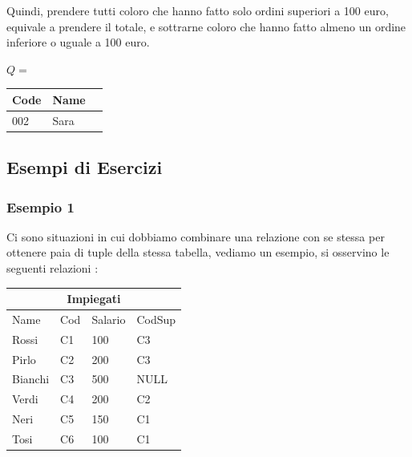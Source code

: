 \documentclass[12pt, letterpaper]{article}
\begin{document}
Quindi, prendere tutti coloro che hanno fatto solo ordini superiori a 100 euro, equivale a prendere 
il totale, e sottrarne coloro che hanno fatto almeno un ordine inferiore o uguale a 100 euro.
\begin{center}
    \(Q = \)
    \begin{tabular}{|l|l|r|}
        \hline
        Code & Name  \\
        \hline
        
        002 & Sara  \\
        
        \hline
        \end{tabular}
\end{center}\subsection{Esempi di Esercizi}\subsubsection{Esempio 1}
Ci sono situazioni in cui dobbiamo combinare una relazione con se stessa per ottenere paia di 
tuple della stessa tabella, vediamo un esempio, si osservino le seguenti relazioni :
\begin{center}
    
        \begin{tabular}{|llll|}
        \hline
        \multicolumn{4}{|c|}{Impiegati}                                                                  \\ \hline
        \multicolumn{1}{|l|}{Name}    & \multicolumn{1}{l|}{Cod} & \multicolumn{1}{l|}{Salario} & CodSup \\ \hline
        \multicolumn{1}{|l|}{Rossi}   & \multicolumn{1}{l|}{C1}  & \multicolumn{1}{l|}{100}     & C3     \\ \hline
        \multicolumn{1}{|l|}{Pirlo}   & \multicolumn{1}{l|}{C2}  & \multicolumn{1}{l|}{200}     & C3     \\ \hline
        \multicolumn{1}{|l|}{Bianchi} & \multicolumn{1}{l|}{C3}  & \multicolumn{1}{l|}{500}     & NULL   \\ \hline
        \multicolumn{1}{|l|}{Verdi}   & \multicolumn{1}{l|}{C4}  & \multicolumn{1}{l|}{200}     & C2     \\ \hline
        \multicolumn{1}{|l|}{Neri}    & \multicolumn{1}{l|}{C5}  & \multicolumn{1}{l|}{150}     & C1     \\ \hline
        \multicolumn{1}{|l|}{Tosi}    & \multicolumn{1}{l|}{C6}  & \multicolumn{1}{l|}{100}     & C1     \\ \hline
        \end{tabular} 
\end{center}
\end{document}
